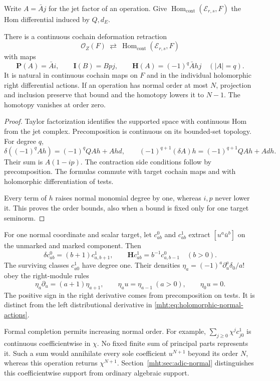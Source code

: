 Write $A=\bar A j$ for the jet factor of an operation.
Give $\operatorname{Hom}_{\mathrm{cont}}(\mathcal E_{r,s},F)$
the Hom differential induced by $Q,d_E$.

\begin{theorem}\label{mht:thm:normal-operation-contraction}
There is a continuous cochain deformation retraction
\[
 \mathcal O_Z(F)\ \rightleftarrows\
                   \operatorname{Hom}_{\mathrm{cont}}(\mathcal E_{r,s},F)
\]
with maps
\[
 \mathbf P(A)=\bar A i,\qquad
 \mathbf I(B)=Bpj,\qquad
 \mathbf H(A)=(-1)^q\bar A h j\quad(|A|=q).
\]
It is natural in continuous cochain maps on $F$ and in
the individual holomorphic right differential actions.
If an operation has normal order at most $N$, projection
and inclusion preserve that bound and the homotopy lowers
it to $N-1$. The homotopy vanishes at order zero.
\end{theorem}
\begin{proof}
Taylor factorization identifies the supported space with
continuous Hom from the jet complex. Precomposition is
continuous on its bounded-set topology. For degree $q$,
\[
 \delta((-1)^qAh)=(-1)^qQAh+Ah d,
 \qquad
 (-1)^{q+1}(\delta A)h=(-1)^{q+1}QAh+Adh.
\]
Their sum is $A(1-ip)$. The contraction side conditions
follow by precomposition. The formulas commute with target
cochain maps and with holomorphic differentiation of tests.

Every term of $h$ raises normal monomial degree by one,
whereas $i,p$ never lower it. This proves the order bounds,
also when a bound is fixed only for one target seminorm.
\end{proof}

For one normal coordinate and scalar target, let $c_{ab}^0$
and $c_{ab}^1$ extract $[u^a\bar u^b]$ on the unmarked
and marked component. Then
\[
 \delta c_{ab}^0=(b+1)c_{a,b+1}^1,
 \qquad
 \mathbf Hc_{ab}^1=b^{-1}c_{a,b-1}^0\quad(b>0).
\]
The surviving classes $c_{a0}^1$ have degree one.
Their densities $\eta_a=(-1)^a\partial_u^a\delta_0/a!$
obey the right-module rules
\[
 \eta_a\partial_u=(a+1)\eta_{a+1},\qquad
 \eta_a u=\eta_{a-1}\ (a>0),\qquad \eta_0u=0.
\]
The positive sign in the right derivative comes from
precomposition on tests. It is distinct from the left
distributional derivative in \eqref{mht:eq:holomorphic-normal-actions}.

Formal completion permits increasing normal order.
For example, $\sum_{j\geq0}\chi^j c_{j0}^1$ is continuous
coefficientwise in $\chi$. No fixed finite sum of principal
parts represents it. Such a sum would annihilate every
sole coefficient $u^{N+1}$ beyond its order $N$, whereas
this operation returns $\chi^{N+1}$.
Section~\ref{mht:sec:adic-normal} distinguishes this
coefficientwise support from ordinary algebraic support.

